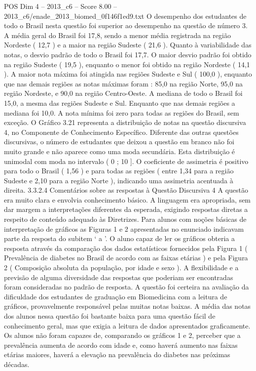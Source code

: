 \begin{textsample}{POS Dim 4 – 2013\_c6 – Score 8.00 – 2013\_c6/enade\_2013\_biomed\_0f146f1ed9.txt}
O desempenho dos estudantes de todo o Brasil nesta questão foi superior ao desempenho na questão de número 3.
A média geral do Brasil foi 17,8, sendo a menor média registrada na região Nordeste ( 12,7 ) e a maior na região Sudeste ( 21,6 ).
Quanto à variabilidade das notas, o desvio padrão de todo o Brasil foi 17,7.
O maior desvio padrão foi obtido na região Sudeste ( 19,5 ), enquanto o menor foi obtido na região Nordeste ( 14,1 ).
A maior nota máxima foi atingida nas regiões Sudeste e Sul ( 100,0 ), enquanto que nas demais regiões as notas máximas foram : 85,0 na região Norte, 95,0 na região Nordeste, e 90,0 na região Centro-Oeste.
A mediana de todo o Brasil foi 15,0, a mesma das regiões Sudeste e Sul.
Enquanto que nas demais regiões a mediana foi 10,0.
A nota mínima foi zero para todas as regiões do Brasil, sem exceção.
O Gráfico 3.21 representa a distribuição de notas na questão discursiva 4, no Componente de Conhecimento Específico.
Diferente das outras questões discursivas, o número de estudantes que deixou a questão em branco não foi muito grande e não aparece como uma moda secundária.
Esta distribuição é unimodal com moda no intervalo ( 0 ; 10 ].
O coeficiente de assimetria é positivo para todo o Brasil ( 1,56 ) e para todas as regiões ( entre 1,34 para a região Sudeste e 2,10 para a região Norte ), indicando uma assimetria acentuada à direita. 3.3.2.4 Comentários sobre as respostas à Questão Discursiva 4 A questão era muito clara e envolvia conhecimento básico.
A linguagem era apropriada, sem dar margem a interpretações diferentes da esperada, exigindo respostas diretas a respeito de conteúdo adequado às Diretrizes.
Para alunos com noções básicas de interpretação de gráficos as Figuras 1 e 2 apresentadas no enunciado indicavam parte da resposta do subitem ‘ a ’.
O aluno capaz de ler os gráficos obteria a resposta através da comparação dos dados estatísticos fornecidos pela Figura 1 ( Prevalência de diabetes no Brasil de acordo com as faixas etárias ) e pela Figura 2 ( Composição absoluta da população, por idade e sexo ).
A flexibilidade e a previsão de alguma diversidade das respostas que poderiam ser encontradas foram consideradas no padrão de resposta.
A questão foi certeira na avaliação da dificuldade dos estudantes de graduação em Biomedicina com a leitura de gráficos, provavelmente responsável pelas muitas notas baixas.
A média das notas dos alunos nessa questão foi bastante baixa para uma questão fácil de conhecimento geral, mas que exigia a leitura de dados apresentados graficamente.
Os alunos não foram capazes de, comparando os gráficos 1 e 2, perceber que a prevalência aumenta de acordo com idade e, como haverá aumento nas faixas etárias maiores, haverá a elevação na prevalência do diabetes nas próximas décadas.

\end{textsample}

